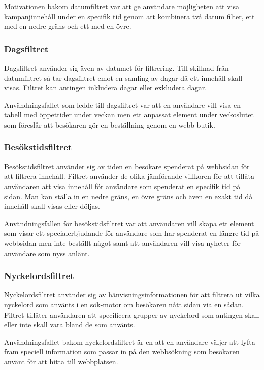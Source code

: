 Motivationen bakom datumfiltret var att ge användare möjligheten att visa kampanjinnehåll under en specifik tid genom att kombinera två datum filter, ett med en nedre gräns och ett med en övre.

\subsubsection{Dagsfiltret}

Dagsfiltret använder sig även av datumet för filtrering. Till skillnad från datumfiltret så tar dagsfiltret emot en samling av dagar då ett innehåll skall visas. Filtret kan antingen inkludera dagar eller exkludera dagar.

Användningsfallet som ledde till dagsfiltret var att en användare vill visa en tabell med öppettider under veckan men ett anpassat element under veckoslutet som föreslår att besökaren gör en beställning genom en webb-butik.

\subsubsection{Besökstidsfiltret}

Besökstidsfiltret använder sig av tiden en besökare spenderat på webbsidan för att filtrera innehåll. Filtret använder de olika jämförande villkoren för att tillåta användaren att visa innehåll för användare som spenderat en specifik tid på sidan. Man kan ställa in en nedre gräns, en övre gräns och även en exakt tid då innehåll skall visas eller döljas.

Användningsfallen för besökstidsfiltret var att användaren vill skapa ett element som visar ett specialerbjudande för användare som har spenderat en längre tid på webbsidan men inte beställt något samt att användaren vill visa nyheter för användare som nyss anlänt.

\subsubsection{Nyckelordsfiltret}

Nyckelordsfiltret använder sig av hänvisningsinformationen för att filtrera ut vilka nyckelord som använts i en sök-motor om besökaren nått sidan via en sådan. Filtret tillåter användaren att specificera grupper av nyckelord som antingen skall eller inte skall vara bland de som använts.

Användningsfallet bakom nyckelordsfiltret är en att en användare väljer att lyfta fram speciell information som passar in på den webbsökning som besökaren använt för att hitta till webbplatsen.

